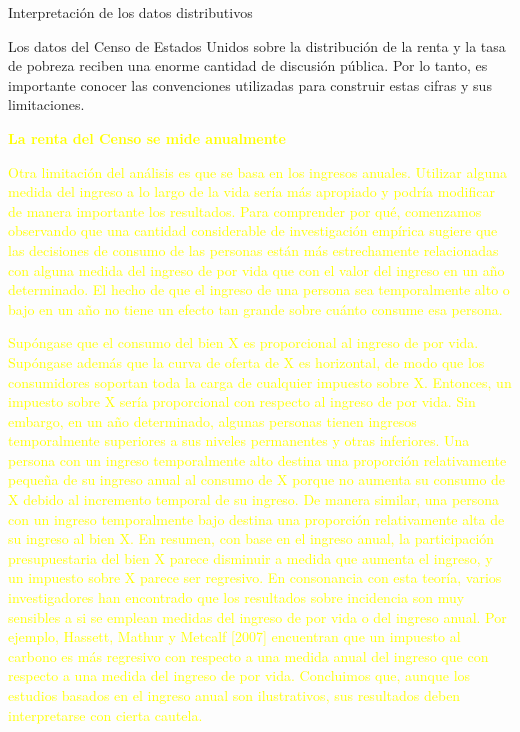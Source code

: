 \documentclass[10pt,a4paper]{article}
\begin{document}
Interpretación de los datos distributivos

Los datos del Censo de Estados Unidos sobre la distribución de la renta y la tasa de pobreza reciben una enorme cantidad de discusión pública. Por lo tanto, es importante conocer las convenciones utilizadas para construir estas cifras y sus limitaciones.

\textcolor{yellow}{\textbf{La renta del Censo se mide anualmente}

Otra limitación del análisis es que se basa en los ingresos anuales. Utilizar alguna medida del ingreso a lo largo de la vida sería más apropiado y podría modificar de manera importante los resultados. Para comprender por qué, comenzamos observando que una cantidad considerable de investigación empírica sugiere que las decisiones de consumo de las personas están más estrechamente relacionadas con alguna medida del ingreso de por vida que con el valor del ingreso en un año determinado. El hecho de que el ingreso de una persona sea temporalmente alto o bajo en un año no tiene un efecto tan grande sobre cuánto consume esa persona.

Supóngase que el consumo del bien X es proporcional al ingreso de por vida. Supóngase además que la curva de oferta de X es horizontal, de modo que los consumidores soportan toda la carga de cualquier impuesto sobre X. Entonces, un impuesto sobre X sería proporcional con respecto al ingreso de por vida. Sin embargo, en un año determinado, algunas personas tienen ingresos temporalmente superiores a sus niveles permanentes y otras inferiores. Una persona con un ingreso temporalmente alto destina una proporción relativamente pequeña de su ingreso anual al consumo de X porque no aumenta su consumo de X debido al incremento temporal de su ingreso. De manera similar, una persona con un ingreso temporalmente bajo destina una proporción relativamente alta de su ingreso al bien X. En resumen, con base en el ingreso anual, la participación presupuestaria del bien X parece disminuir a medida que aumenta el ingreso, y un impuesto sobre X parece ser regresivo. En consonancia con esta teoría, varios investigadores han encontrado que los resultados sobre incidencia son muy sensibles a si se emplean medidas del ingreso de por vida o del ingreso anual. Por ejemplo, Hassett, Mathur y Metcalf [2007] encuentran que un impuesto al carbono es más regresivo con respecto a una medida anual del ingreso que con respecto a una medida del ingreso de por vida. Concluimos que, aunque los estudios basados en el ingreso anual son ilustrativos, sus resultados deben interpretarse con cierta cautela.

}
\end{document}
